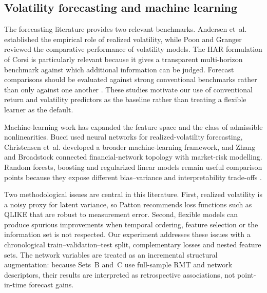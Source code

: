 \subsection{Volatility forecasting and machine learning}

The forecasting literature provides two relevant benchmarks. Andersen et~al. \cite{andersen_2003_modeling} established the empirical role of realized volatility, while Poon and Granger \cite{poon_granger_2003} reviewed the comparative performance of volatility models. The HAR formulation of Corsi \cite{corsi_2009_simple} is particularly relevant because it gives a transparent multi-horizon benchmark against which additional information can be judged. Forecast comparisons should be evaluated against strong conventional benchmarks rather than only against one another \cite{hansen_lunde_2005}. These studies motivate our use of conventional return and volatility predictors as the baseline rather than treating a flexible learner as the default.

Machine-learning work has expanded the feature space and the class of admissible nonlinearities. Bucci \cite{bucci_2020_realized} used neural networks for realized-volatility forecasting, Christensen et~al. \cite{christensen_2022_realized} developed a broader machine-learning framework, and Zhang and Broadstock \cite{zhang_2023_network_volatility} connected financial-network topology with market-risk modelling. Random forests, boosting and regularized linear models remain useful comparison points because they expose different bias--variance and interpretability trade-offs \cite{breiman_2001_random,friedman_2001_greedy,hoerl_kennard_1970_ridge}.

Two methodological issues are central in this literature. First, realized volatility is a noisy proxy for latent variance, so Patton \cite{patton_2011_volatility} recommends loss functions such as QLIKE that are robust to measurement error. Second, flexible models can produce spurious improvements when temporal ordering, feature selection or the information set is not respected. Our experiment addresses these issues with a chronological train--validation--test split, complementary losses and nested feature sets. The network variables are treated as an incremental structural augmentation: because Sets~B and~C use full-sample RMT and network descriptors, their results are interpreted as retrospective associations, not point-in-time forecast gains.
